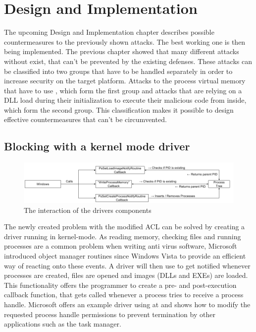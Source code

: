 \section{Design and Implementation}
The upcoming Design and Implementation chapter describes possible countermeasures to the previously shown attacks. The best working one is then being implemented.
\label{sec:implementation}
The previous chapter showed that many different attacks without exist, that can't be prevented by the existing defenses. These attacks can be classified into two groups that have to be handled separately in order to increase security on the target platform. Attacks to the process virtual memory that have to use , which form the first group and attacks that are relying on a DLL load during their initialization to execute their malicious code from inside, which form the second group. This classification makes it possible to design effective countermeasures that can't be circumvented. 

\subsection{Blocking  with a kernel mode driver}
\begin{figure}[h]
\centering
\includegraphics[angle=90,scale=0.6]{sections/implementation/interaction.png}
\caption{The interaction of the drivers components}
\label{fig:interaction}
\end{figure}
The newly created problem with the modified ACL can be solved by creating a driver running in kernel-mode. As reading memory, checking files and running processes are a common problem when writing anti virus software, Microsoft introduced object manager routines since Windows Vista to provide an efficient way of reacting onto these events. A driver will then use  to get notified whenever processes are created, files are opened and images (DLLs and EXEs) are loaded. This functionality offers the programmer to create a pre- and post-execution callback function, that gets called whenever a process tries to receive a process handle. Microsoft offers an example driver using  at \cite{github_obcallback} and shows how to modify the requested process handle permissions to prevent termination by other applications such as the task manager. 

